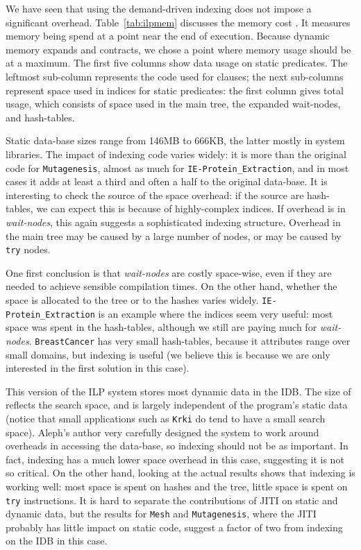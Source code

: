 \documentclass{llncs}
\newcommand{\JITI}{demand-driven indexing\xspace}
\begin{document}
We have seen that using the \JITI does not impose a significant
overhead. Table~\ref{tab:ilpmem} discusses the memory cost . It
measures memory being spend at a point near the end of execution.
Because dynamic memory expands and contracts, we chose a point where
memory usage should be at a maximum. The first five columns show data
usage on static predicates.  The leftmost sub-column represents the
code used for clauses; the next sub-columns represent space used in
indices for static predicates: the first column gives total usage,
which consists of space used in the main tree, the expanded
wait-nodes, and hash-tables.

Static data-base sizes range from 146MB to 666KB, the latter mostly in
system libraries. The impact of indexing code varies widely: it is
more than the original code for \texttt{Mutagenesis}, almost as much
for \texttt{IE-Protein\_Extraction}, and in most cases it adds at
least a third and often a half to the original data-base. It is
interesting to check the source of the space overhead: if the source
are hash-tables, we can expect this is because of highly-complex
indices. If overhead is in \emph{wait-nodes}, this again suggests a
sophisticated indexing structure. Overhead in the main tree may be
caused by a large number of nodes, or may be caused by \texttt{try}
nodes.

One first conclusion is that \emph{wait-nodes} are costly space-wise,
even if they are needed to achieve sensible compilation times.  On the
other hand, whether the space is allocated to the tree or to the
hashes varies widely. \texttt{IE-Protein\_Extraction} is an example
where the indices seem very useful: most space was spent in the
hash-tables, although we still are paying much for \emph{wait-nodes}.
\texttt{BreastCancer} has very small hash-tables, because it
attributes range over small domains, but indexing is useful (we
believe this is because we are only interested in the first solution
in this case).

This version of the ILP system stores most dynamic data in the IDB.
The size of reflects the search space, and is largely independent of
the program's static data (notice that small applications such as
\texttt{Krki} do tend to have a small search space). Aleph's author
very carefully designed the system to work around overheads in
accessing the data-base, so indexing should not be as important.  In
fact, indexing has a much lower space overhead in this case,
suggesting it is not so critical.  On the other hand, looking at the
actual results shows that indexing is working well: most space is
spent on hashes and the tree, little space is spent on \texttt{try}
instructions. It is hard to separate the contributions of JITI on
static and dynamic data, but the results for \texttt{Mesh} and
\texttt{Mutagenesis}, where the JITI probably has little impact on
static code, suggest a factor of two from indexing on the IDB in this
case.
\end{document}
